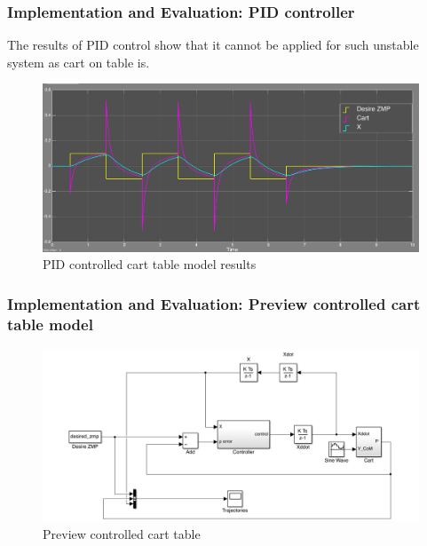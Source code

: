 \documentclass{beamer}
\begin{document}

	\begin{frame}
		\frametitle{Implementation and Evaluation: PID controller}
		The results of PID control show that it cannot be applied for such unstable system as cart on table is.
		
		\begin{figure}[h!]
			\centering
			\includegraphics[width=\linewidth]{presentation_images/21}
			\caption{PID controlled cart table model results}
		\end{figure}
	\end{frame}
	

	\begin{frame}
		\frametitle{Implementation and Evaluation: Preview controlled cart table model}
		\begin{figure}[h!]
			\centering
			\includegraphics[width=\linewidth]{presentation_images/22}
			\caption{Preview controlled cart table}
		\end{figure}
	\end{frame}
	
\end{document}
